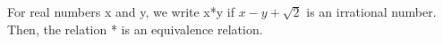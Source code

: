 \iffalse
\title{Assignment 2}
\author{AI24BTECH11014 - Charitha Sri}
\section{true-false}
\fi
\item For real numbers x and y, we write x*y if $x-y+\sqrt{2}$ is an irrational number. Then, the relation * is an equivalence relation.
		\hfill{}
